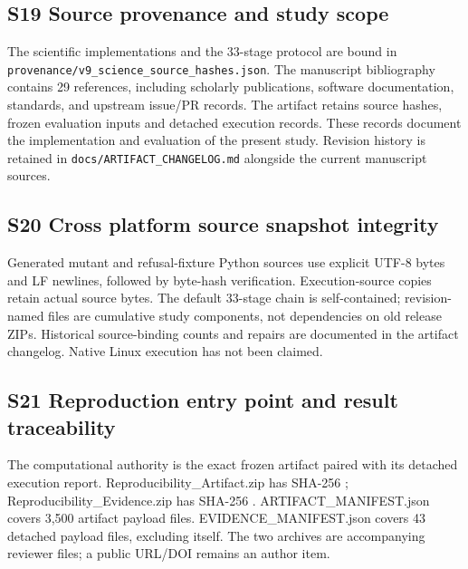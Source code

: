 \documentclass[11pt,a4paper]{article}
\theoremstyle{plain}
\theoremstyle{definition}
\theoremstyle{remark}
\begin{document}
\subsection*{S19 Source provenance and study scope}\label{sec:s19}

The scientific implementations and the 33-stage protocol are bound in \texttt{provenance/\allowbreak v9\_\allowbreak science\_\allowbreak source\_\allowbreak hashes.json}. The manuscript bibliography contains 29 references, including scholarly publications, software documentation, standards, and upstream issue/PR records. The artifact retains source hashes, frozen evaluation inputs and detached execution records. These records document the implementation and evaluation of the present study. Revision history is retained in \texttt{docs/\allowbreak ARTIFACT\_\allowbreak CHANGELOG.md} alongside the current manuscript sources.


\subsection*{S20 Cross platform source snapshot integrity}\label{sec:s20}

Generated mutant and refusal-fixture Python sources use explicit UTF-8 bytes and LF newlines, followed by byte-hash verification. Execution-source copies retain actual source bytes. The default 33-stage chain is self-contained; revision-named files are cumulative study components, not dependencies on old release ZIPs. Historical source-binding counts and repairs are documented in the artifact changelog. Native Linux execution has not been claimed.


\subsection*{S21 Reproduction entry point and result traceability}\label{sec:s21}

The computational authority is the exact frozen artifact paired with its detached execution report. Reproducibility\_Artifact.zip has SHA-256 \texttt{}; Reproducibility\_Evidence.zip has SHA-256 \texttt{}. ARTIFACT\_MANIFEST.json covers 3,500 artifact payload files. EVIDENCE\_MANIFEST.json covers 43 detached payload files, excluding itself. The two archives are accompanying reviewer files; a public URL/DOI remains an author item.
\end{document}
